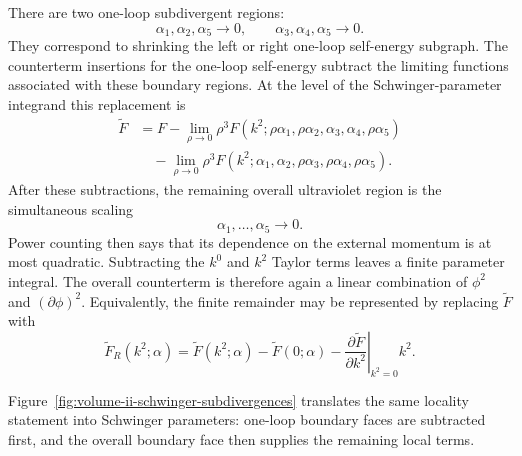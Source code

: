 There are two one-loop subdivergent regions:
\[
  \alpha_1,\alpha_2,\alpha_5\to0,
  \qquad
  \alpha_3,\alpha_4,\alpha_5\to0 .
\]
They correspond to shrinking the left or right one-loop self-energy subgraph.
The counterterm insertions for the one-loop self-energy subtract the limiting
functions associated with these boundary regions.  At the level of the
Schwinger-parameter integrand this replacement is
\[
\begin{aligned}
  \widetilde F
  &=
  F
  -
  \lim_{\rho\to0}
  \rho^3
  F(k^2;\rho\alpha_1,\rho\alpha_2,\alpha_3,\alpha_4,\rho\alpha_5)
\\
  &\quad
  -
  \lim_{\rho\to0}
  \rho^3
  F(k^2;\alpha_1,\alpha_2,\rho\alpha_3,\rho\alpha_4,\rho\alpha_5).
\end{aligned}
\]
After these subtractions, the remaining overall ultraviolet region is the
simultaneous scaling
\[
  \alpha_1,\ldots,\alpha_5\to0 .
\]
Power counting then says that its dependence on the external momentum is at
most quadratic.  Subtracting the \(k^0\) and \(k^2\) Taylor terms leaves a
finite parameter integral.  The overall counterterm is therefore again a
linear combination of \(\phi^2\) and \((\partial\phi)^2\).
Equivalently, the finite remainder may be represented by replacing
\(\widetilde F\) with
\[
  \widetilde F_R(k^2;\alpha)
  =
  \widetilde F(k^2;\alpha)
  -
  \widetilde F(0;\alpha)
  -
  \left.
    \frac{\partial\widetilde F}{\partial k^2}
  \right|_{k^2=0}
  k^2 .
\]

Figure~\ref{fig:volume-ii-schwinger-subdivergences} translates the same locality
statement into Schwinger parameters: one-loop boundary faces are subtracted
first, and the overall boundary face then supplies the remaining local terms.

